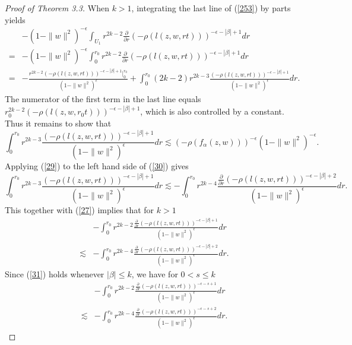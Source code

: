 \documentclass[reqno,12pt]{amsart}
\numberwithin{equation}{section}
\begin{document}
\begin{proof}[Proof of Theorem 3.3]
{			When $k>1$, integrating the last line of (\ref{253}) by parts yields
				\begin{align}\label{27}
				&-(1-\|w\|^2)^{-\epsilon}\int_{U_1}r^{2k-2}{\frac{\partial}{\partial r}\left(-\rho\left(l(z,w,r t)\right)\right)^{-\epsilon-|\beta|+1}}dr\nonumber
				\\=&-(1-\|w\|^2)^{-\epsilon}\int_{0}^{r_0}r^{2k-2}{\frac{\partial}{\partial r}\left(-\rho\left(l(z,w,r t)\right)\right)^{-\epsilon-|\beta|+1}}dr\nonumber
				\\=&-\frac{r^{2k-2}{\left(-\rho\left(l(z,w,r t)\right)\right)^{-\epsilon-|\beta|+1}}\Big|_0^{r_0}}{(1-\|w\|^2)^{\epsilon}}+\int_{0}^{r_0}(2k-2)r^{2k-3}\frac{{\left(-\rho\left(l(z,w,r t)\right)\right)^{-\epsilon-|\beta|+1}}}{(1-\|w\|^2)^{\epsilon}}dr.
				\end{align}
			{The numerator of the first term in the last line equals ${r_0^{2k-2}(-\rho(l(z,w,r_0t)))^{-\epsilon-|\beta|+1}}$}, which is also controlled by a constant. Thus it remains to show that
			\begin{equation}\label{30}
			\int_{0}^{r_0}r^{2k-3}\frac{{\left(-\rho\left(l(z,w,r t)\right)\right)^{-\epsilon-|\beta|+1}}}{(1-\|w\|^2)^{\epsilon}}dr\lesssim \left(-\rho\left(f_{\alpha}(z,w)\right)\right)^{-\epsilon}(1-\|w\|^2)^{-\epsilon}.
			\end{equation}}
			Applying (\ref{29}) to the left hand side of (\ref{30}) gives
			$$\int_{0}^{r_0}r^{2k-3}\frac{{\left(-\rho\left(l(z,w,r t)\right)\right)^{-\epsilon-|\beta|+1}}}{(1-\|w\|^2)^{\epsilon}}dr\lesssim-\int_{0}^{r_0}r^{2k-4}\frac{\frac{\partial}{\partial r}{\left(-\rho\left(l(z,w,r t)\right)\right)^{-\epsilon-|\beta|+2}}}{(1-\|w\|^2)^{\epsilon}}dr.$$
			This together with (\ref{27}) implies that for $k>1$
			\begin{align}\label{31}
			&-\int_{0}^{r_0}r^{2k-2}\frac{\frac{\partial}{\partial r}{\left(-\rho\left(l(z,w,r t)\right)\right)^{-\epsilon-|\beta|+1}}}{(1-\|w\|^2)^{\epsilon}}dr\nonumber\\\lesssim&-\int_{0}^{r_0}r^{2k-4}\frac{\frac{\partial}{\partial r}{\left(-\rho\left(l(z,w,r t)\right)\right)^{-\epsilon-|\beta|+2}}}{(1-\|w\|^2)^{\epsilon}}dr.
			\end{align}
		{Since (\ref{31}) holds whenever $|\beta|\leq k$, we have for $0<s\leq k$
				\begin{align}\label{310}
			&-\int_{0}^{r_0}r^{2k-2}\frac{\frac{\partial}{\partial r}{\left(-\rho\left(l(z,w,r t)\right)\right)^{-\epsilon-s+1}}}{(1-\|w\|^2)^{\epsilon}}dr\nonumber\\\lesssim&-\int_{0}^{r_0}r^{2k-4}\frac{\frac{\partial}{\partial r}{\left(-\rho\left(l(z,w,r t)\right)\right)^{-\epsilon-s+2}}}{(1-\|w\|^2)^{\epsilon}}dr.

\end{align}}
\end{proof}
\end{document}

